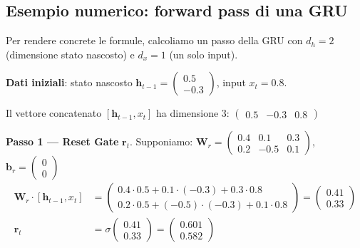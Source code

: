 \documentclass[12pt,a4paper]{article}
\begin{document}
\subsection{Esempio numerico: forward pass di una GRU}

Per rendere concrete le formule, calcoliamo un passo della GRU con $d_h = 2$ (dimensione stato nascosto) e $d_x = 1$ (un solo input).

\begin{examplebox}
\textbf{Dati iniziali}: stato nascosto $\mathbf{h}_{t-1} = \begin{pmatrix} 0.5 \\ -0.3 \end{pmatrix}$, input $x_t = 0.8$.

Il vettore concatenato $[\mathbf{h}_{t-1}, x_t]$ ha dimensione 3:
$\begin{pmatrix} 0.5 & -0.3 & 0.8 \end{pmatrix}$

\textbf{Passo 1 --- Reset Gate} $\mathbf{r}_t$. Supponiamo:
$\mathbf{W}_r = \begin{pmatrix} 0.4 & 0.1 & 0.3 \\ 0.2 & -0.5 & 0.1 \end{pmatrix}$, $\mathbf{b}_r = \begin{pmatrix} 0 \\ 0 \end{pmatrix}$
\begin{align*}
    \mathbf{W}_r \cdot [\mathbf{h}_{t-1}, x_t] &= \begin{pmatrix} 0.4 \cdot 0.5 + 0.1 \cdot (-0.3) + 0.3 \cdot 0.8 \\ 0.2 \cdot 0.5 + (-0.5) \cdot (-0.3) + 0.1 \cdot 0.8 \end{pmatrix} = \begin{pmatrix} 0.41 \\ 0.33 \end{pmatrix} \\
    \mathbf{r}_t &= \sigma\!\begin{pmatrix} 0.41 \\ 0.33 \end{pmatrix} = \begin{pmatrix} 0.601 \\ 0.582 \end{pmatrix}
\end{align*}


\end{examplebox}
\end{document}
